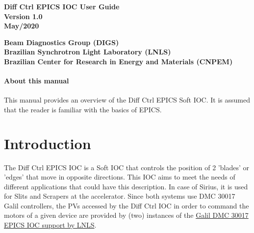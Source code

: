 \documentclass[openany]{article}
\begin{document}
\begin{titlepage}

\thispagestyle{fancy}

\begin{center}

\vspace*{\fill}
\textbf{\Huge Diff Ctrl EPICS IOC User Guide}\\[20pt]
\textbf{\Huge Version 1.0}\\[20pt]
\textbf{\Huge May/2020}
\vspace*{\fill}

\vfill
\textbf{Beam Diagnostics Group (DIGS)}\\[5pt]
\textbf{Brazilian Synchrotron Light Laboratory (LNLS)}\\[5pt]
\textbf{Brazilian Center for Research in Energy and Materials (CNPEM)}
\end{center}

\end{titlepage}

\newpage
\pagestyle{plain} %

\paragraph{}{\Large\bfseries About this manual}

\paragraph{} This manual provides an overview of the Diff Ctrl EPICS Soft IOC. It is assumed that the reader is familiar with the basics of EPICS.

\tableofcontents

\newpage
\section{Introduction}

\paragraph{} The Diff Ctrl EPICS IOC is a Soft IOC that controls the position of 2 'blades' or 'edges' that move in opposite directions. This IOC aims to meet the needs of different applications that could have this description. In case of Sirius, it is used for Slits and Scrapers at the accelerator. Since both systems use DMC 30017 Galil controllers, the PVs accessed by the Diff Ctrl IOC in order to command the motors of a given device are provided by (two) instances of the \href{https://github.com/lnls-dig/galil-dmc30017-epics-ioc}{Galil DMC 30017 EPICS IOC support by LNLS}.
\end{document}

